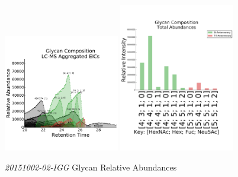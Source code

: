     \begin{figure}[!htbp]
        \centering
        \includegraphics[width=0.45\textwidth,valign=t]{figure/igg_chromatograms.pdf}
        \includegraphics[width=0.45\textwidth,valign=t]{figure/igg_abundances.pdf}
        \caption{\textit{20151002-02-IGG} Glycan Relative Abundances}
        \label{fig:igg_aggregated_eics}
    \end{figure}

